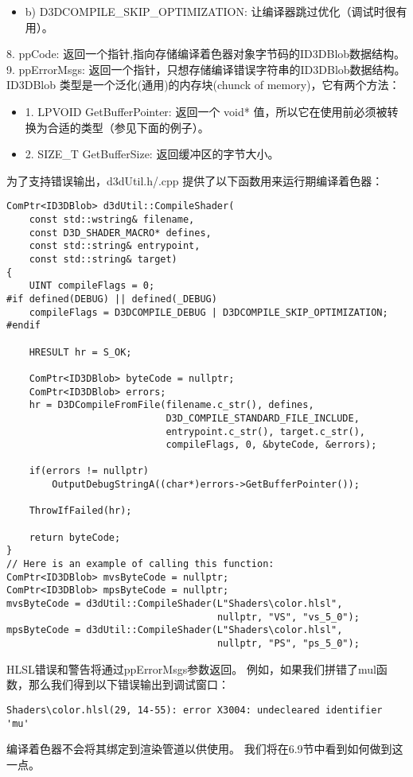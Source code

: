 \begin{flushleft}
\begin{itemize}
  \item b) D3DCOMPILE\_SKIP\_OPTIMIZATION: 让编译器跳过优化（调试时很有用）。
\end{itemize}
8. ppCode: 返回一个指针,指向存储编译着色器对象字节码的ID3DBlob数据结构。\\
9. ppErrorMsgs: 返回一个指针，只想存储编译错误字符串的ID3DBlob数据结构。\\
ID3DBlob 类型是一个泛化(通用)的内存块(chunck of memory)，它有两个方法：\\
\begin{itemize}
    \item 1. LPVOID GetBufferPointer: 返回一个 void* 值，所以它在使用前必须被转换为合适的类型（参见下面的例子）。
    \item 2. SIZE\_T GetBufferSize: 返回缓冲区的字节大小。
\end{itemize}
为了支持错误输出，d3dUtil.h/.cpp 提供了以下函数用来运行期编译着色器：\\
\begin{lstlisting}
ComPtr<ID3DBlob> d3dUtil::CompileShader(
    const std::wstring& filename,
    const D3D_SHADER_MACRO* defines,
    const std::string& entrypoint,
    const std::string& target)
{
    UINT compileFlags = 0;
#if defined(DEBUG) || defined(_DEBUG)  
    compileFlags = D3DCOMPILE_DEBUG | D3DCOMPILE_SKIP_OPTIMIZATION;
#endif

    HRESULT hr = S_OK;

    ComPtr<ID3DBlob> byteCode = nullptr;
    ComPtr<ID3DBlob> errors;
    hr = D3DCompileFromFile(filename.c_str(), defines, 
                            D3D_COMPILE_STANDARD_FILE_INCLUDE,
                            entrypoint.c_str(), target.c_str(), 
                            compileFlags, 0, &byteCode, &errors);

    if(errors != nullptr)
        OutputDebugStringA((char*)errors->GetBufferPointer());

    ThrowIfFailed(hr);

    return byteCode;
}
// Here is an example of calling this function:
ComPtr<ID3DBlob> mvsByteCode = nullptr;
ComPtr<ID3DBlob> mpsByteCode = nullptr;
mvsByteCode = d3dUtil::CompileShader(L"Shaders\color.hlsl", 
                                     nullptr, "VS", "vs_5_0");
mpsByteCode = d3dUtil::CompileShader(L"Shaders\color.hlsl", 
                                     nullptr, "PS", "ps_5_0");
\end{lstlisting}
HLSL错误和警告将通过ppErrorMsgs参数返回。 例如，如果我们拼错了mul函数，那么我们得到以下错误输出到调试窗口：\\
\begin{lstlisting}
Shaders\color.hlsl(29, 14-55): error X3004: undecleared identifier 'mu'
\end{lstlisting}
编译着色器不会将其绑定到渲染管道以供使用。 我们将在6.9节中看到如何做到这一点。
\end{flushleft}

